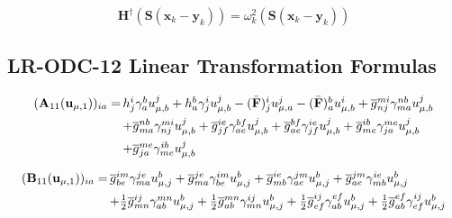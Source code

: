 \begin{equation}
    \mathbf{H}^\dagger
    (\mathbf{S}(\mathbf{x}_k - \mathbf{y}_k))
    =
    \omega_k^2
    (\mathbf{S}(\mathbf{x}_k - \mathbf{y}_k))
\end{equation}


\begin{subappendices}
\section{LR-ODC-12 Linear Transformation Formulas}
\label{sec:linear-transformation-formulas}

\begin{equation}
    \begin{array}{r@{\,}l}
        (\mathbf{A}_{11}(\mathbf{u}_{\mu,1}))_{ia}
        =
        &
        h_j^i
        \gamma_a^b
        u_{\mu,b}^j
        +
        h_a^b
        \gamma_j^i
        u_{\mu,b}^j
        -
        (\bar{\mathbf{F}})_j^i
        u_{\mu,a}^j
        -
        (\bar{\mathbf{F}})_a^b
        u_{\mu,b}^i
        +
        \overline{g}_{nj}^{mi}
        \gamma_{ma}^{nb}
        u_{\mu,b}^j
        \\[5pt]
        &
        +
        \overline{g}_{ma}^{nb}
        \gamma_{nj}^{mi}
        u_{\mu,b}^j
        +
        \overline{g}_{jf}^{ie}
        \gamma_{ae}^{bf}
        u_{\mu,b}^j
        +
        \overline{g}_{ae}^{bf}
        \gamma_{jf}^{ie}
        u_{\mu,b}^j
        +
        \overline{g}_{me}^{ib}
        \gamma_{ja}^{me}
        u_{\mu,b}^j
        \\[5pt]
        &
        +
        \overline{g}_{ja}^{me}
        \gamma_{me}^{ib}
        u_{\mu,b}^j
    \end{array}
\end{equation}

\begin{equation}
    \begin{array}{r@{\,}l}
        (\mathbf{B}_{11}(\mathbf{u}_{\mu,1}))_{ia}
        =
        &
        \overline{g}_{be}^{im}
        \gamma_{ma}^{je}
        u_{\mu,j}^b
        +
        \overline{g}_{ma}^{je}
        \gamma_{be}^{im}
        u_{\mu,j}^b
        +
        \overline{g}_{mb}^{ie}
        \gamma_{ae}^{jm}
        u_{\mu,j}^b
        +
        \overline{g}_{ae}^{jm}
        \gamma_{mb}^{ie}
        u_{\mu,j}^b
        \\[5pt]
        &
        +
        \tfrac{1}{2}
        \overline{g}_{mn}^{ij}
        \gamma_{ab}^{mn}
        u_{\mu,j}^b
        +
        \tfrac{1}{2}
        \overline{g}_{ab}^{mn}
        \gamma_{mn}^{ij}
        u_{\mu,j}^b
        +
        \tfrac{1}{2}
        \overline{g}_{ef}^{ij}
        \gamma_{ab}^{ef}
        u_{\mu,j}^b
        +
        \tfrac{1}{2}
        \overline{g}_{ab}^{ef}
        \gamma_{ef}^{ij}
        u_{\mu,j}^b
    \end{array}
\end{equation}


\end{subappendices}
